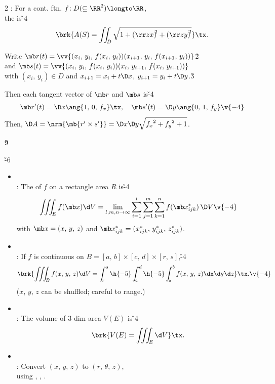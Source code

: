 \documentclass[dvipdfmx,a4paper,titlepage,9pt]{jsarticle}
\begin{document}
\begin{multicols*}{2}
: For a cont. ftn. $f\!: D(\subseteq\RR^2)\longto\RR$,\\
\;\;\;\;the  is\v{-4}
$$\brk{A(S)=\iint_{\!D}\sqrt{1+\left(\rr zx\right)^{\!\!2}+\left(\rr zy\right)^{\!\!2}}}\tx.$$

\begin{Pfbox}
Write $\mb r(t)=\vv{(x_i,\,y_i,\,f(x_i,\,y_i))(x_{i+1},\,y_i,\,f(x_{i+1},\,y_i))}$\v2\\
and $\mb s(t)=\vv{(x_i,\,y_i,\,f(x_i,\,y_i))(x_i,\,y_{i+1},\,f(x_i,\,y_{i+1}))}$\\
with $(x_i,\,y_i)\in D$ and $x_{i+1}=x_i+t\D x$, $y_{i+1}=y_i+t\D y$.\v3

Then each tangent vector of $\mb r$ and $\mb s$ is\v{-4}
$$\mb r'(t)=\D x\ang{1,\,0,\,f_x}\tx,\quad\mb s'(t)=\D y\ang{0,\,1,\,f_y}\v{-4}$$
Then, $\D A=\nrm{\mb{r'\times s'}}=\D x\D y\sqrt{{f_x}^2+{f_y}^2+1}$.
\end{Pfbox}\v9

\v{-6}
\begin{itemize}[label={-}]
\item{}\\
: The  of $f$ on a rectangle area $R$ is\v{-4}
$$\iiint_{\!E} f(\mb x)\d V=\lim_{l,m,n\to\infty}\sum_{i=1}^l\sum_{j=1}^m\sum_{k=1}^n f(\mb x_{ijk}^*)\,\D V\v{-4}$$
\;\;with $\mb x=(x,\,y,\,z)$ and $\mb x_{ijk}^*=(x_{ijk}^*,\,y_{ijk}^*,\,z_{ijk}^*)$.\\

\item{}\\
: If $f$ is continuous on $B=[a,\,b]\times[c,\,d]\times[r,\,s]$,\v{-4}
$$\brk{\iiint_{\!B} f(x,\,y,\,z)\d V=\int_{\!r}^s\h{-5}\int_{\!c}^d\h{-5}\int_{\!a}^bf(x,\,y,\,z)\dx\dy\d z}\tx.\v{-4}$$
\;\;($x$, $y$, $z$ can be shuffled; careful to range.)\\

\item{}\\
: The volume of 3-dim area $V(E)$ is\v{-4}
$$\brk{V(E)=\iiint_{\!E}\d V}\tx.$$ 

\vfill\null\columnbreak

\item{}\\
: Convert $(x,\,y,\,z)$ to $(r,\,\theta,\,z)$,\\
\;\;using , , .\\
\end{itemize}


\end{multicols*}
\end{document}
